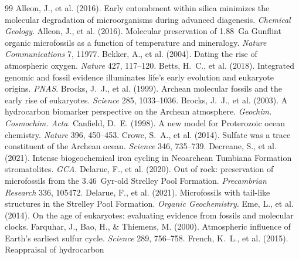 \documentclass[11pt]{article}
\begin{document}

\begin{thebibliography}{99}\footnotesize\linespread{0.92}\selectfont\setlength{\itemsep}{0pt}\setlength{\parskip}{0pt}
 Alleon, J., et al. (2016). Early entombment within
silica minimizes the molecular degradation of microorganisms during advanced diagenesis.
\textit{Chemical Geology}.
 Alleon, J., et al. (2016). Molecular preservation of
1.88~Ga Gunflint organic microfossils as a function of temperature and mineralogy. \textit{Nature
Communications} 7, 11977.
 Bekker, A., et al. (2004). Dating the rise of atmospheric
oxygen. \textit{Nature} 427, 117--120.
 Betts, H.~C., et al. (2018). Integrated genomic and fossil
evidence illuminates life's early evolution and eukaryote origins. \textit{PNAS}.
 Brocks, J.~J., et al. (1999). Archean molecular fossils
and the early rise of eukaryotes. \textit{Science} 285, 1033--1036.
 Brocks, J.~J., et al. (2003). A hydrocarbon biomarker
perspective on the Archean atmosphere. \textit{Geochim. Cosmochim. Acta}.
 Canfield, D.~E. (1998). A new model for Proterozoic ocean
chemistry. \textit{Nature} 396, 450--453.
 Crowe, S.~A., et al. (2014). Sulfate was a trace constituent
of the Archean ocean. \textit{Science} 346, 735--739.
 Decreane, S., et al. (2021). Intense biogeochemical
iron cycling in Neoarchean Tumbiana Formation stromatolites. \textit{GCA}.
 Delarue, F., et al. (2020). Out of rock: preservation of
microfossils from the 3.46~Gyr-old Strelley Pool Formation. \textit{Precambrian Research} 336, 105472.
 Delarue, F., et al. (2021). Microfossils with tail-like
structures in the Strelley Pool Formation. \textit{Organic Geochemistry}.
 Eme, L., et al. (2014). On the age of eukaryotes: evaluating
evidence from fossils and molecular clocks.
 Farquhar, J., Bao, H., \& Thiemens, M. (2000).
Atmospheric influence of Earth's earliest sulfur cycle. \textit{Science} 289, 756--758.
 French, K.~L., et al. (2015). Reappraisal of hydrocarbon

\end{thebibliography}
\end{document}
